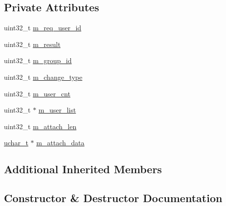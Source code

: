 \subsection*{Private Attributes}
\begin{DoxyCompactItemize}
\item 
uint32\+\_\+t \hyperlink{class_c_im_pdu_group_change_member_response_a8d08942f46d601a06ba7539d2c6f6a49}{m\+\_\+req\+\_\+user\+\_\+id}
\item 
uint32\+\_\+t \hyperlink{class_c_im_pdu_group_change_member_response_aff1b4b30c5ed6d861fc6959af5e45975}{m\+\_\+result}
\item 
uint32\+\_\+t \hyperlink{class_c_im_pdu_group_change_member_response_a6414b993072779719e1644f3deac8be1}{m\+\_\+group\+\_\+id}
\item 
uint32\+\_\+t \hyperlink{class_c_im_pdu_group_change_member_response_ae958b831efe78f922f7584231e52ade4}{m\+\_\+change\+\_\+type}
\item 
uint32\+\_\+t \hyperlink{class_c_im_pdu_group_change_member_response_aa53443233f375f19caacbdfcb7ce25a7}{m\+\_\+user\+\_\+cnt}
\item 
uint32\+\_\+t $\ast$ \hyperlink{class_c_im_pdu_group_change_member_response_aa3b0ba1a17042420b9cf3549df3c97e2}{m\+\_\+user\+\_\+list}
\item 
uint32\+\_\+t \hyperlink{class_c_im_pdu_group_change_member_response_a982825916147216f15ce0c628c71ec36}{m\+\_\+attach\+\_\+len}
\item 
\hyperlink{base_2ostype_8h_a124ea0f8f4a23a0a286b5582137f0b8d}{uchar\+\_\+t} $\ast$ \hyperlink{class_c_im_pdu_group_change_member_response_a866945c80342c52e53afd6cdc16834e2}{m\+\_\+attach\+\_\+data}
\end{DoxyCompactItemize}
\subsection*{Additional Inherited Members}


\subsection{Constructor \& Destructor Documentation}
\hypertarget{class_c_im_pdu_group_change_member_response_afb04a232d7f24fc479167cf39b63ab25}{}
